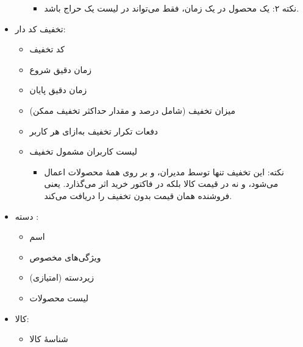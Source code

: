\documentclass[]{article}
\begin{document}
\begin{itemize}
\begin{itemize}
\begin{itemize}[label = $\blacksquare$]
\item
نکته ۲:‌ یک محصول در یک زمان، فقط می‌تواند در لیست یک حراج باشد.
\end{itemize}

\end{itemize}

\item
تخفیف کد دار:

\begin{itemize}
\item
کد تخفیف

\item
زمان دقیق شروع

\item
زمان دقیق پایان

\item
میزان تخفیف (شامل درصد و مقدار حداکثر تخفیف ممکن)

\item
دفعات تکرار تخفیف به‌ازای هر کاربر

\item
لیست کاربران مشمول تخفیف


\begin{itemize}[label = {$\blacksquare$}]
\item
نکته:‌ این تخفیف تنها توسط مدیران، و بر روی همهٔ محصولات اعمال می‌شود، و نه در قیمت کالا بلکه در فاکتور خرید اثر می‌گذارد. یعنی فروشنده همان قیمت بدون تخفیف را دریافت می‌کند.
\end{itemize}

\end{itemize}



\item
دسته :

\begin{itemize}
\item
اسم

\item
ویژگی‌های مخصوص

\item
زیردسته (امتیازی)

\item
لیست محصولات




\end{itemize}
\item
کالا:

\begin{itemize}

\item
شناسهٔ کالا 


\end{itemize}
\end{itemize}
\end{document}
